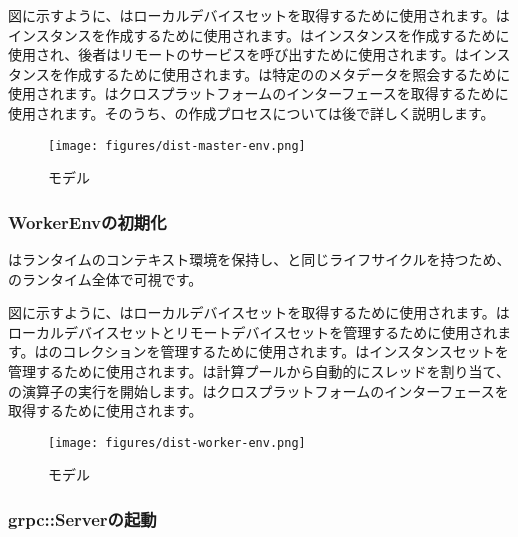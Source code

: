 \begin{content}
図に示すように、はローカルデバイスセットを取得するために使用されます。はインスタンスを作成するために使用されます。はインスタンスを作成するために使用され、後者はリモートのサービスを呼び出すために使用されます。はインスタンスを作成するために使用されます。は特定ののメタデータを照会するために使用されます。はクロスプラットフォームのインターフェースを取得するために使用されます。そのうち、の作成プロセスについては後で詳しく説明します。

\begin{figure}[H]
\centering
\texttt{[image: figures/dist-master-env.png]}
\caption{モデル}
 \label{fig:dist-master-env}
\end{figure}

\subsubsection{WorkerEnvの初期化}

はランタイムのコンテキスト環境を保持し、と同じライフサイクルを持つため、のランタイム全体で可視です。

図に示すように、はローカルデバイスセットを取得するために使用されます。はローカルデバイスセットとリモートデバイスセットを管理するために使用されます。はのコレクションを管理するために使用されます。はインスタンスセットを管理するために使用されます。は計算プールから自動的にスレッドを割り当て、の演算子の実行を開始します。はクロスプラットフォームのインターフェースを取得するために使用されます。

\begin{figure}[H]
\centering
\texttt{[image: figures/dist-worker-env.png]}
\caption{モデル}
 \label{fig:dist-worker-env}
\end{figure}

\subsubsection{grpc::Serverの起動}


\end{content}
